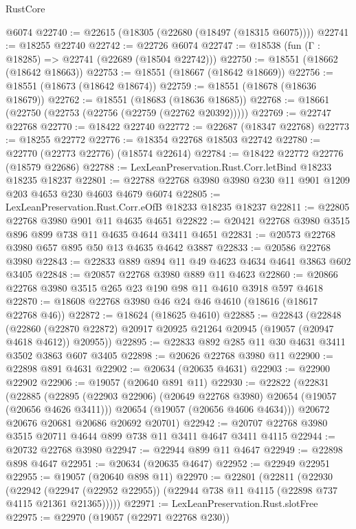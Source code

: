 \begin{lexlean}{RustCore}
\begin{coremodule}
    @6074
@22740 := @22615 (@18305 (@22680 (@18497 (@18315 @6075))))
@22741 := @18255 @22740
@22742 := @22726 @6074
@22747 := @18538 (fun (Γ : @18285) => @22741 (@22689 (@18504 @22742)))
@22750 := @18551 (@18662 (@18642 @18663))
@22753 := @18551 (@18667 (@18642 @18669))
@22756 := @18551 (@18673 (@18642 @18674))
@22759 := @18551 (@18678 (@18636 @18679))
@22762 := @18551 (@18683 (@18636 @18685))
@22768 := @18661 (@22750 (@22753 (@22756 (@22759 (@22762 @20392)))))
@22769 := @22747 @22768
@22770 := @18422 @22740
@22772 := @22687 (@18347 @22768)
@22773 := @18255 @22772
@22776 := @18354 @22768 @18503 @22742
@22780 := @22770 (@22773 @22776) (@18574 @22614)
@22784 := @18422 @22772 @22776 (@18579 @22686)
@22788 := LexLeanPreservation.Rust.Corr.letBind @18233 @18235 @18237
@22801 := @22788 @22768 @3980 @3980 @230 @11 @901 @1209 @203 @4653 @230 @4603 @4679 @6074
@22805 := LexLeanPreservation.Rust.Corr.eOfB @18233 @18235 @18237
@22811 := @22805 @22768 @3980 @901 @11 @4635 @4651
@22822 := @20421 @22768 @3980 @3515 @896 @899 @738 @11 @4635 @4644 @3411 @4651
@22831 := @20573 @22768 @3980 @657 @895 @50 @13 @4635 @4642 @3887
@22833 := @20586 @22768 @3980
@22843 := @22833 @889 @894 @11 @49 @4623 @4634 @4641 @3863 @602 @3405
@22848 := @20857 @22768 @3980 @889 @11 @4623
@22860 := @20866 @22768 @3980 @3515 @265 @23 @190 @98 @11 @4610 @3918 @597 @4618
@22870 := @18608 @22768 @3980 @46 @24 @46 @4610 (@18616 (@18617 @22768 @46))
@22872 := @18624 (@18625 @4610)
@22885 := @22843
    (@22848
      (@22860 (@22870 @22872) @20917 @20925 @21264 @20945 (@19057 (@20947 @4618 @4612)) @20955))
@22895 := @22833 @892 @285 @11 @30 @4631 @3411 @3502 @3863 @607 @3405
@22898 := @20626 @22768 @3980 @11
@22900 := @22898 @891 @4631
@22902 := @20634 (@20635 @4631)
@22903 := @22900 @22902
@22906 := @19057 (@20640 @891 @11)
@22930 := @22822
    (@22831
      (@22885
        (@22895 (@22903 @22906) (@20649 @22768 @3980) @20654 (@19057 (@20656 @4626 @3411)))
        @20654
        (@19057 (@20656 @4606 @4634)))
      @20672
      @20676
      @20681
      @20686
      @20692
      @20701)
@22942 := @20707 @22768 @3980 @3515 @20711 @4644 @899 @738 @11 @3411 @4647 @3411 @4115
@22944 := @20732 @22768 @3980
@22947 := @22944 @899 @11 @4647
@22949 := @22898 @898 @4647
@22951 := @20634 (@20635 @4647)
@22952 := @22949 @22951
@22955 := @19057 (@20640 @898 @11)
@22970 := @22801
    (@22811
      (@22930
        (@22942
          (@22947 (@22952 @22955))
          (@22944 @738 @11 @4115 (@22898 @737 @4115 @21361 @21365)))))
@22971 := LexLeanPreservation.Rust.slotFree
@22975 := @22970 (@19057 (@22971 @22768 @230))

\end{coremodule}
\end{lexlean}
